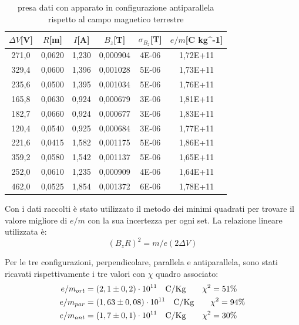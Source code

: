 \documentclass{article}
\begin{document}
    \begin{table}[H]
        
            \centering
            \begin{tabular}{ cccccc } 
            \toprule 
            $\Delta V$[V] & $R$[m] & $I$[A] & $B_z$[T] & $\sigma_{B_z}$[T] & $e/m$[C kg^{-1}] \\
            \midrule 
            271,0	&	0,0620	&	1,230	&	0,000904	&	4E-06	&	1,72E+11    \\
            329,4	&	0,0600	&	1,396	&	0,001028	&	5E-06	&	1,73E+11    \\
            235,6	&	0,0500	&	1,395	&	0,001034	&	5E-06	&	1,76E+11    \\
            165,8	&	0,0630	&	0,924	&	0,000679	&	3E-06	&	1,81E+11    \\
            182,7	&	0,0660	&	0,924	&	0,000677	&	3E-06	&	1,83E+11    \\
            120,4	&	0,0540	&	0,925	&	0,000684	&	3E-06	&	1,77E+11    \\
            221,6	&	0,0415	&	1,582	&	0,001175	&	5E-06	&	1,86E+11    \\
            359,2	&	0,0580	&	1,542	&	0,001137	&	5E-06	&	1,65E+11    \\
            252,0	&	0,0610	&	1,235	&	0,000909	&	4E-06	&	1,64E+11    \\
            462,0	&	0,0525	&	1,854	&	0,001372	&	6E-06	&	1,78E+11    \\
            \bottomrule           
        \end{tabular}
        \caption{presa dati con apparato in configurazione antiparallela rispetto al campo magnetico terrestre}
        \label{misure antiparalleli}
    \end{table}
    
    Con i dati raccolti è stato utilizzato il metodo dei minimi quadrati per trovare il valore migliore di $e/m$ con la sua incertezza per ogni set. La relazione lineare utilizzata è:
    \begin{equation}\label{Relazione lineare}
        (B_z R)^2 = m/e (2\Delta V) 
    \end{equation}
        
    Per le tre configurazioni, perpendicolare, parallela e antiparallela, sono stati ricavati rispettivamente i tre valori con $\chi$ quadro associato:
    \begin{align*}
        e/m_{ort} &= (2,1 \pm 0,2)\cdot 10^{11} \qq{C/Kg} \quad \chi^2 = 51\% \\
        e/m_{par} &= (1,63 \pm 0,08) \cdot 10^{11} \qq{C/Kg} \quad \chi^2 = 94\% \\
        e/m_{ant} &= (1,7 \pm 0,1) \cdot 10^{11}  \qq{C/Kg} \quad \chi^2 = 30\%
    \end{align*}
\end{document}

